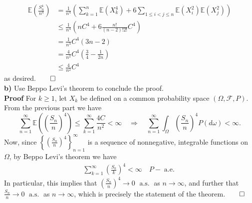 \documentclass[10pt]{article}
\newcommand{\E}{\mathbb{E}}
\newcommand{\bp}[1]{\left({#1}\right)}
\newcommand{\1}[1]{\mathbbm{1}_{#1}}
\newcommand{\mc}[1]{\mathcal{#1}}
\DeclareMathOperator{\as}{a.s.}
\DeclareMathOperator{\ale}{a.e.}
\begin{document}
    \begin{align*}
        \E\bp{\frac{S_n^4}{n^4}}&=\frac{1}{n^4}\bp{\sum_{k=1}^n\E(X_k^4)+6\sum_{1\leq i<j\leq n}\E(X_i^2)\E(X_j^2)}\\
        &\leq \frac{1}{n^4}\bp{nC^4+6\frac{n!}{(n-2)!2!}C^4}\\
        &=\frac{1}{n^3}C^4\bp{3n-2}\\
        &=\frac{4}{n^2}C^4\bp{\frac{3}{4}-\frac{1}{2n}}\\
        &\leq \frac{4}{n^2}C^4
    \end{align*}
    as desired.\hfill{$\qed$}\\[5pt]
    {\bf b)}\hspace{5pt} Use Beppo Levi's theorem to conclude the proof.\\[5pt]
    {\bf Proof}\hspace{5pt} For $k\geq 1$, let $X_k$ be defined on a common probability space $(\Omega,\mc{F},P)$. From the previous part we have
    \[\sum_{n=1}^\infty\E\bp{\bp{\frac{S_n}{n}}^4}\leq\sum_{k=1}^\infty\frac{4C}{n^2}<\infty\quad\Rightarrow\quad\sum_{n=1}^\infty\int_{\Omega}\bp{\frac{S_n}{n}}^4P(d\omega)<\infty.\]
    Now, since $\left\{\bp{\tfrac{S_n}{n}}^4\right\}_{n=1}^\infty$ is a sequence of nonnegative, integrable functions on $\Omega$, by Beppo Levi's theorem we have
    \begin{align*}
        \sum_{k=1}^\infty\bp{\frac{S_k}{k}}^4<\infty\quad P-\ale
    \end{align*} 
    In particular, this implies that $\bp{\tfrac{S_n}{n}}^4\rightarrow 0$ $\as$ as $n\rightarrow\infty$, and further that $\tfrac{S_n}{n}\rightarrow 0$ $\as$ as $n\rightarrow\infty$, which is precisely the statement of the theorem.\hfill{$\qed$}\\[5pt]
\end{document}
